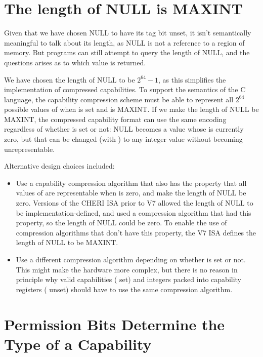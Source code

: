 \section{The length of NULL is MAXINT}

Given that we have chosen NULL to have its tag bit unset, it isn't semantically
meaningful to talk about its length, as NULL is not a reference to a region
of memory. But programs can still attempt to query the length of NULL, and
the questions arises as to which value is returned.

We have chosen the length of NULL to be $2^{64}-1$, as this simplifies the
implementation of compressed capabilities. To support the semantics of the
C language, the capability compression scheme must be able to represent
all $2^{64}$ possible values of \coffset{} when \ctag{} is set and \clength{}
is MAXINT. If we make the length of NULL be MAXINT, the compressed capability
format can use the same encoding regardless of whether \ctag{} is set or
not:  NULL becomes a value whose \coffset{} is currently zero, but that can
be changed (with ) to any integer value without
becoming unrepresentable.

Alternative design choices included:

\begin{itemize}
\item
Use a capability compression algorithm that also has the property that all
values of \coffset{} are representable when \clength{} is zero, and make
the length of NULL be zero. Versions of the CHERI ISA prior to V7 allowed the
length of NULL to be implementation-defined, and used a compression algorithm
that had this property, so the length of NULL could be zero. To enable the
use of compression algorithms that don't have this property, the V7 ISA
defines the length of NULL to be MAXINT.
\item
Use a different compression algorithm depending on whether \ctag{} is set
or not. This might make the hardware more complex, but there is no reason in
principle why valid capabilities (\ctag{} set) and integers packed into
capability registers (\ctag{} unset) should have to use the same compression
algorithm.
\end{itemize}

\section{Permission Bits Determine the Type of a Capability}

